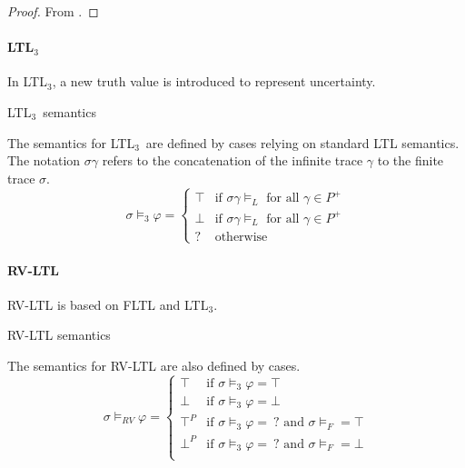 \documentclass[a4paper]{article}
\newcommand{\tand}{\text{ and }}
\newcommand{\fall}{\text{ for all }}
\begin{document}
\begin{proof}
  From \autocite{bauer2010comparing}.
\end{proof}

\newcommand{\ltlt}{LTL$_3$}
\paragraph{\ltlt} In \ltlt, a new truth value is introduced to represent uncertainty.
\begin{defn}{\ltlt\ semantics}

  The semantics for \ltlt\ are defined by cases relying on standard LTL semantics. The notation $\sigma\gamma$ refers to the concatenation of the infinite trace $\gamma$ to the finite trace $\sigma$.
  \[\sigma\vDash_3\varphi =
    \begin{cases}
      \top & \text{if } \sigma\gamma \vDash_L \fall \gamma \in P^+\\
      \bot & \text{if } \sigma\gamma \vDash_L \fall \gamma \in P^+\\
      ? & \text{otherwise}
    \end{cases}
    \]
\end{defn}

\paragraph{RV-LTL} RV-LTL is based on FLTL and \ltlt.
\begin{defn}{RV-LTL semantics}

  The semantics for RV-LTL are also defined by cases.
  \[\sigma\vDash_{RV}\varphi =
    \begin{cases}
      \top & \text{if } \sigma \vDash_3 \varphi = \top\\
      \bot & \text{if } \sigma \vDash_3 \varphi = \bot\\
      \top^P & \text{if } \sigma \vDash_3 \varphi = ~?\tand \sigma\vDash_F = \top \\
      \bot^P & \text{if } \sigma \vDash_3 \varphi = ~?\tand \sigma\vDash_F = \bot \\

    \end{cases}
  \]
\end{defn}
\end{document}
